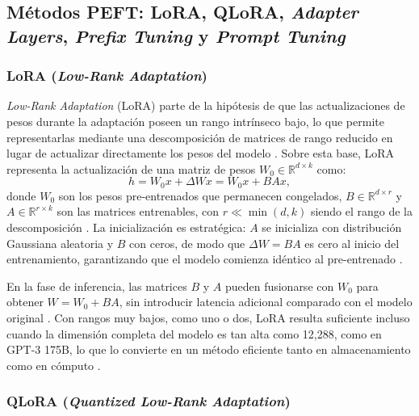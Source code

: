 \subsection{Métodos PEFT: LoRA, QLoRA, \textit{Adapter Layers}, \textit{Prefix Tuning} y \textit{Prompt Tuning}}

\subsubsection{LoRA (\textit{Low-Rank Adaptation})}

\textit{Low-Rank Adaptation} (LoRA) parte de la hipótesis de que las actualizaciones de pesos durante la adaptación poseen un rango intrínseco bajo, lo que permite representarlas mediante una descomposición de matrices de rango reducido en lugar de actualizar directamente los pesos del modelo \parencite[p.~2]{hu2021loralowrankadaptationlarge}. Sobre esta base, LoRA representa la actualización de una matriz de pesos $W_0 \in \mathbb{R}^{d \times k}$ como:
\begin{equation}
h = W_0 x + \Delta W x = W_0 x + BAx,
\end{equation}
donde $W_0$ son los pesos pre-entrenados que permanecen congelados, $B \in \mathbb{R}^{d \times r}$ y $A \in \mathbb{R}^{r \times k}$ son las matrices entrenables, con $r \ll \min(d, k)$ siendo el rango de la descomposición \parencite[p.~4]{hu2021loralowrankadaptationlarge}. La inicialización es estratégica: $A$ se inicializa con distribución Gaussiana aleatoria y $B$ con ceros, de modo que $\Delta W = BA$ es cero al inicio del entrenamiento, garantizando que el modelo comienza idéntico al pre-entrenado \parencite[p.~4]{hu2021loralowrankadaptationlarge}.

En la fase de inferencia, las matrices $B$ y $A$ pueden fusionarse con $W_0$ para obtener $W = W_0 + BA$, sin introducir latencia adicional comparado con el modelo original \parencite[p.~2]{hu2021loralowrankadaptationlarge}. Con rangos muy bajos, como uno o dos, LoRA resulta suficiente incluso cuando la dimensión completa del modelo es tan alta como 12{,}288, como en GPT-3 175B, lo que lo convierte en un método eficiente tanto en almacenamiento como en cómputo \parencite[p.~2]{hu2021loralowrankadaptationlarge}.

\subsubsection{QLoRA (\textit{Quantized Low-Rank Adaptation})}

